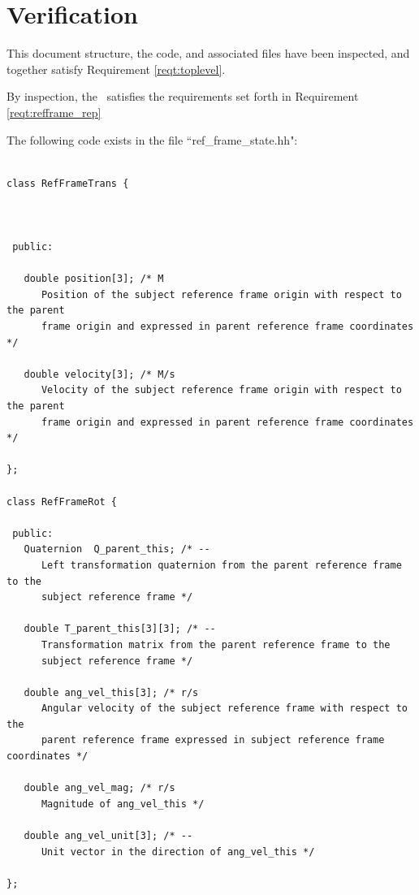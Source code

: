 \section{Verification}
\label{inspect:TLI}
 This document structure, the code, and associated files have been inspected, and together satisfy Requirement \ref{reqt:toplevel}.

\label{inspect:refframe_representation}

By inspection, the \ satisfies the requirements set forth
in Requirement \ref{reqt:refframe_rep}

\label{inspect:refframe_state}

The following code exists in the file ``ref\_frame\_state.hh":

\begin{verbatim}

class RefFrameTrans {



 public:

   double position[3]; /* M
      Position of the subject reference frame origin with respect to the parent
      frame origin and expressed in parent reference frame coordinates */

   double velocity[3]; /* M/s
      Velocity of the subject reference frame origin with respect to the parent
      frame origin and expressed in parent reference frame coordinates */

};

class RefFrameRot {

 public:
   Quaternion  Q_parent_this; /* --
      Left transformation quaternion from the parent reference frame to the
      subject reference frame */

   double T_parent_this[3][3]; /* --
      Transformation matrix from the parent reference frame to the
      subject reference frame */

   double ang_vel_this[3]; /* r/s
      Angular velocity of the subject reference frame with respect to the
      parent reference frame expressed in subject reference frame coordinates */

   double ang_vel_mag; /* r/s
      Magnitude of ang_vel_this */

   double ang_vel_unit[3]; /* --
      Unit vector in the direction of ang_vel_this */

};

\end{verbatim}

